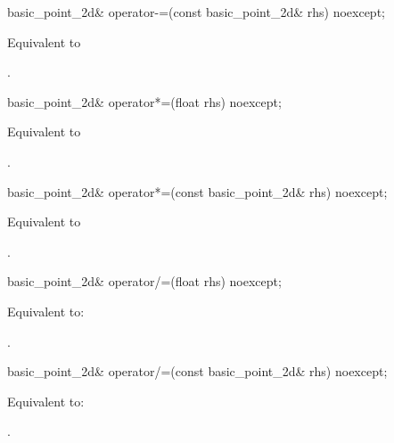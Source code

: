 %
\begin{itemdecl}
basic_point_2d& operator-=(const basic_point_2d& rhs) noexcept;
\end{itemdecl}
\begin{itemdescr}
\pnum
\effects
Equivalent to 

\pnum
\returns
{}.
\end{itemdescr}

%
\begin{itemdecl}
basic_point_2d& operator*=(float rhs) noexcept;
\end{itemdecl}
\begin{itemdescr}
\pnum
\effects
Equivalent to 

\pnum
\returns
{}.
\end{itemdescr}

%
\begin{itemdecl}
basic_point_2d& operator*=(const basic_point_2d& rhs) noexcept;
\end{itemdecl}
\begin{itemdescr}
\pnum
\effects
Equivalent to 

\pnum
\returns
{}.
\end{itemdescr}

%
\begin{itemdecl}
basic_point_2d& operator/=(float rhs) noexcept;
\end{itemdecl}
\begin{itemdescr}
\pnum
\effects
Equivalent to: 

\pnum
\returns
{}.
\end{itemdescr}

%
\begin{itemdecl}
basic_point_2d& operator/=(const basic_point_2d& rhs) noexcept;
\end{itemdecl}
\begin{itemdescr}
\pnum
\effects
Equivalent to: 

\pnum
\returns
{}.
\end{itemdescr}

